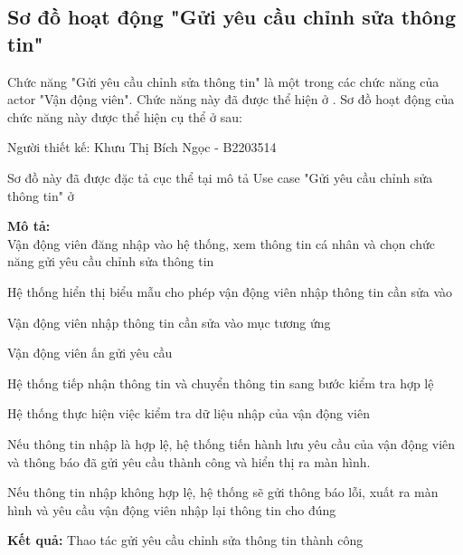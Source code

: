 \subsection{Sơ đồ hoạt động "Gửi yêu cầu chỉnh sửa thông tin"}
\setcounter{figure}{0}

Chức năng "Gửi yêu cầu chỉnh sửa thông tin" là một trong các chức năng của actor "Vận động viên".
Chức năng này đã được thể hiện ở .
Sơ đồ hoạt động của chức năng này được thể hiện cụ thể ở \myref{} sau:

Người thiết kế: Khưu Thị Bích Ngọc - B2203514

Sơ đồ này đã được đặc tả cục thể tại mô tả Use case
"Gửi yêu cầu chỉnh sửa thông tin" ở 

\noindent
\textbf{Mô tả:}\\
Vận động viên đăng nhập vào hệ thống, xem thông tin cá nhân và chọn chức năng gửi yêu cầu chỉnh sửa thông tin \par
Hệ thống hiển thị biểu mẫu cho phép vận động viên nhập thông tin cần sửa vào \par
Vận động viên nhập thông tin cần sửa vào mục tương ứng \par
Vận động viên ấn gửi yêu cầu \par
Hệ thống tiếp nhận thông tin và chuyển thông tin sang bước kiểm tra hợp lệ \par
Hệ thống thực hiện việc kiểm tra dữ liệu nhập của vận động viên \par
Nếu thông tin nhập là hợp lệ, hệ thống tiến hành lưu yêu cầu của vận động viên và thông báo đã gửi yêu cầu thành công và hiển thị ra màn hình. \par
Nếu thông tin nhập không hợp lệ, hệ thống sẽ gửi thông báo lỗi, xuất ra màn hình và yêu cầu vận động viên nhập lại thông tin cho đúng

\noindent
\textbf{Kết quả:} Thao tác gửi yêu cầu chỉnh sửa thông tin thành công


